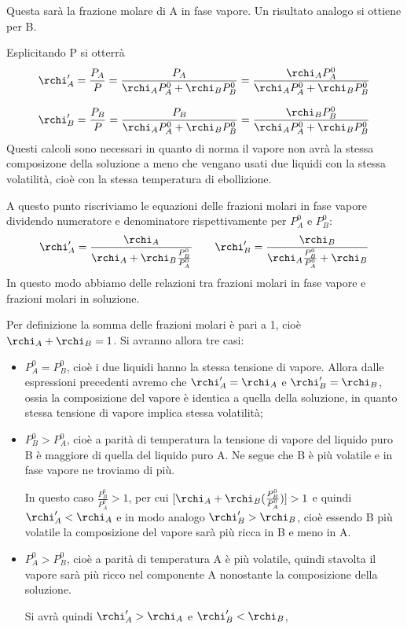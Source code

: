 Questa sarà la frazione molare di A in fase vapore. Un risultato analogo si ottiene per B.

Esplicitando P si otterrà
$$\rchi '_A=\frac{P_A}{P}=
\frac{P_A}{\rchi_A P_A^0 + \rchi_B P_B^0}=
\frac{\rchi_A P_A^0}{\rchi_A P_A^0 + \rchi_B P_B^0}$$

$$\rchi '_B=\frac{P_B}{P}=
\frac{P_B}{\rchi_A P_A^0 + \rchi_B P_B^0}=
\frac{\rchi_B P_B^0}{\rchi_A P_A^0 + \rchi_B P_B^0}$$
Questi calcoli sono necessari in quanto di norma il vapore non avrà la stessa composizone della soluzione a meno che vengano usati due liquidi con la stessa volatilità, cioè con la stessa temperatura di ebollizione.

A questo punto riscriviamo le equazioni delle frazioni molari in fase vapore dividendo numeratore e denominatore rispettivamente per $P_A^0$ e $P_B^0$:
$$\rchi'_A=\frac{\rchi_A}{\rchi_A + \rchi_B\frac{P^0_B}{P^0_A}}
\qquad
\rchi'_B=\frac{\rchi_B}{\rchi_A\frac{P^0_B}{P^0_A} + \rchi_B}$$
In questo modo abbiamo delle relazioni tra frazioni molari in fase vapore e frazioni molari in soluzione.

Per definizione la somma delle frazioni molari è pari a 1, cioè $\rchi_A + \rchi_B =1$. Si avranno allora tre casi:
\begin{itemize}
    \item $P_A^0=P_B^0$, cioè i due liquidi hanno la stessa tensione di vapore. Allora dalle espressioni precedenti avremo che $\rchi_A'=\rchi_A$ e $\rchi_B'=\rchi_B$, ossia la composizione del vapore è identica a quella della soluzione, in quanto stessa tensione di vapore implica stessa volatilità;
    \item $P_B^0>P_A^0$, cioè a parità di temperatura la tensione di vapore del liquido puro B è maggiore di quella del liquido puro A. Ne segue che B è più volatile e in fase vapore ne troviamo di più.
    
    In questo caso $\frac{P_B^0}{P_A^0}>1$, per cui $[\rchi_A + \rchi_B(\frac{P_B^0}{P_A^0})]>1$ e quindi $\rchi_A' < \rchi_A$ e in modo analogo $\rchi_B' > \rchi_B$, cioè essendo B più volatile la composizione del vapore sarà più ricca in B e meno in A.
    \item  $P_A^0>P_B^0$, cioè a parità di temperatura A è più volatile, quindi stavolta il vapore sarà più ricco nel componente A nonostante la composizione della soluzione.
    
    Si avrà quindi $\rchi_A' > \rchi_A$ e $\rchi_B' < \rchi_B$,
\end{itemize}

